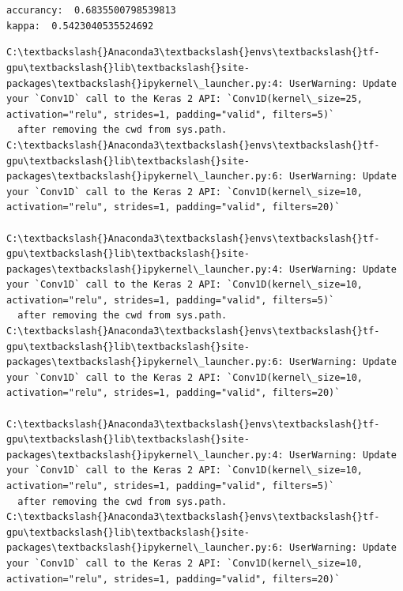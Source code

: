 \documentclass[11pt]{article}
\begin{document}
    \begin{center}
    \end{center}
    { \hspace*{\fill} \\}
    
    \begin{center}
    \end{center}
    { \hspace*{\fill} \\}
    
    \begin{Verbatim}[commandchars=\\\{\}]
accurancy:  0.6835500798539813
kappa:  0.5423040535524692

    \end{Verbatim}

    \begin{Verbatim}[commandchars=\\\{\}]
C:\textbackslash{}Anaconda3\textbackslash{}envs\textbackslash{}tf-gpu\textbackslash{}lib\textbackslash{}site-packages\textbackslash{}ipykernel\_launcher.py:4: UserWarning: Update your `Conv1D` call to the Keras 2 API: `Conv1D(kernel\_size=25, activation="relu", strides=1, padding="valid", filters=5)`
  after removing the cwd from sys.path.
C:\textbackslash{}Anaconda3\textbackslash{}envs\textbackslash{}tf-gpu\textbackslash{}lib\textbackslash{}site-packages\textbackslash{}ipykernel\_launcher.py:6: UserWarning: Update your `Conv1D` call to the Keras 2 API: `Conv1D(kernel\_size=10, activation="relu", strides=1, padding="valid", filters=20)`
  
C:\textbackslash{}Anaconda3\textbackslash{}envs\textbackslash{}tf-gpu\textbackslash{}lib\textbackslash{}site-packages\textbackslash{}ipykernel\_launcher.py:4: UserWarning: Update your `Conv1D` call to the Keras 2 API: `Conv1D(kernel\_size=10, activation="relu", strides=1, padding="valid", filters=5)`
  after removing the cwd from sys.path.
C:\textbackslash{}Anaconda3\textbackslash{}envs\textbackslash{}tf-gpu\textbackslash{}lib\textbackslash{}site-packages\textbackslash{}ipykernel\_launcher.py:6: UserWarning: Update your `Conv1D` call to the Keras 2 API: `Conv1D(kernel\_size=10, activation="relu", strides=1, padding="valid", filters=20)`
  
C:\textbackslash{}Anaconda3\textbackslash{}envs\textbackslash{}tf-gpu\textbackslash{}lib\textbackslash{}site-packages\textbackslash{}ipykernel\_launcher.py:4: UserWarning: Update your `Conv1D` call to the Keras 2 API: `Conv1D(kernel\_size=10, activation="relu", strides=1, padding="valid", filters=5)`
  after removing the cwd from sys.path.
C:\textbackslash{}Anaconda3\textbackslash{}envs\textbackslash{}tf-gpu\textbackslash{}lib\textbackslash{}site-packages\textbackslash{}ipykernel\_launcher.py:6: UserWarning: Update your `Conv1D` call to the Keras 2 API: `Conv1D(kernel\_size=10, activation="relu", strides=1, padding="valid", filters=20)`
  

    \end{Verbatim}
\end{document}
